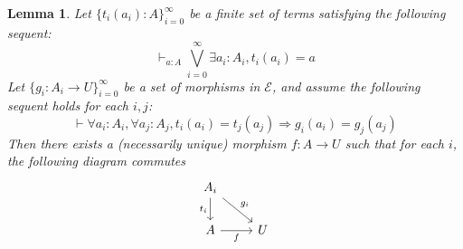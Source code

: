 \documentclass{birkjour}
\theoremstyle{plain}
\newtheorem{lemma}[thm]{Lemma}
\theoremstyle{definition}
\newcommand{\call}[1]{\mathcal{#1}}
\begin{document}
\begin{lemma}
	\label{functionglueing}
	Let $\lbrace t_i(a_i): A \rbrace_{i = 0}^\infty$ be a finite set of terms satisfying the following sequent:
	\begin{equation}
		\label{epimorphicfamily}
		\vdash_{a:A}\bigvee_{i = 0}^\infty \exists a_i: A_i, t_i(a_i) = a
	\end{equation}
	Let $\lbrace g_i: A_i \to U\rbrace_{i = 0}^\infty$ be a set of morphisms in $\call{E}$, and assume the following sequent holds for each $i,j$:
	\begin{equation}
		\label{welldefined}
		\vdash \forall a_i : A_i, \forall a_j: A_j, t_i(a_i) = t_j(a_j) \Rightarrow g_i(a_i) = g_j(a_j)
	\end{equation}
	Then there exists a (necessarily unique) morphism $f: A \to  U$ such that for each $i$, the following diagram commutes
	\[
	\begin{tikzcd}
		A_i\arrow[dr,"{g_i}"]\arrow[d,swap,"{t_i}"]\\
		A\arrow[r,swap,"f"] & U
	\end{tikzcd}
	\]
\end{lemma}
\end{document}
